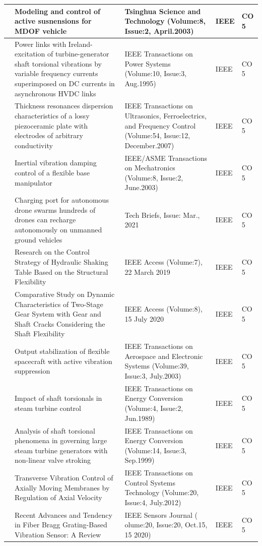\documentclass[11pt,paper=a4,answers]{exam}
\begin{document}
\begin{flushleft}
\begin{longtable}{|>{\centering\arraybackslash}p{1.4cm}  |  >{\raggedright\arraybackslash}p{6cm} |>{\centering\arraybackslash}p{3.75cm}|>{\centering\arraybackslash}p{2cm} |>{\centering\arraybackslash}p{2cm} |}
87&Modeling and control of active susnensions for MDOF vehicle&Tsinghua Science and Technology (Volume:8, Issue:2, April.2003)&IEEE&CO 5\\\hline
88&Power links with Ireland-excitation of turbine-generator shaft torsional vibrations by variable frequency currents superimposed on DC currents in asynchronous HVDC links&IEEE Transactions on Power Systems (Volume:10, Issue:3, Aug.1995)&IEEE&CO 5\\\hline
89&Thickness resonances dispersion characteristics of a lossy piezoceramic plate with electrodes of arbitrary conductivity&IEEE Transactions on Ultrasonics, Ferroelectrics, and Frequency Control (Volume:54, Issue:12, December.2007)&IEEE&CO 5\\\hline
90&Inertial vibration damping control of a flexible base manipulator&IEEE/ASME Transactions on Mechatronics (Volume:8, Issue:2, June.2003)&IEEE&CO 5\\\hline
91&Charging port for autonomous drone swarms hundreds of drones can recharge autonomously on unmanned ground vehicles & Tech Briefs, Issue: Mar., 2021&IEEE&CO 5\\\hline
92&Research on the Control Strategy of Hydraulic Shaking Table Based on the Structural Flexibility&IEEE Access (Volume:7), 22 March 2019&IEEE&CO 5\\\hline
93&Comparative Study on Dynamic Characteristics of Two-Stage Gear System with Gear and Shaft Cracks Considering the Shaft Flexibility&IEEE Access (Volume:8), 15 July 2020&IEEE&CO 5\\\hline
94&Output stabilization of flexible spacecraft with active vibration suppression&IEEE Transactions on Aerospace and Electronic Systems (Volume:39, Issue:3, July.2003)&IEEE&CO 5\\\hline
95&Impact of shaft torsionals in steam turbine control&IEEE Transactions on Energy Conversion (Volume:4, Issue:2, Jun.1989)&IEEE&CO 5\\\hline
96&Analysis of shaft torsional phenomena in governing large steam turbine generators with non-linear valve stroking&IEEE Transactions on Energy Conversion (Volume:14, Issue:3, Sep.1999)&IEEE&CO 5\\\hline
97&Transverse Vibration Control of Axially Moving Membranes by Regulation of Axial Velocity&IEEE Transactions on Control Systems Technology (Volume:20, Issue:4, July.2012)&IEEE&CO 5\\\hline
98&Recent Advances and Tendency in Fiber Bragg Grating-Based Vibration Sensor: A Review&IEEE Sensors Journal ( olume:20, Issue:20, Oct.15, 15 2020)&IEEE&CO 5\\\hline

\end{longtable}
\end{flushleft}
\end{document}
